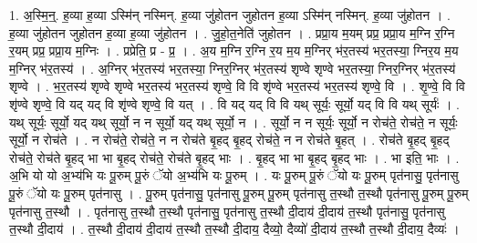 \documentclass[17pt]{extarticle}
\begin{document}
1. अ॒स्मि॒न्॒. ह॒व्या ह॒व्या ऽस्मि॑न् नस्मिन्. ह॒व्या जु॑होतन जुहोतन ह॒व्या ऽस्मि॑न् नस्मिन्. ह॒व्या जु॑होतन । . ह॒व्या जु॑होतन जुहोतन ह॒व्या ह॒व्या जु॑होतन । . जु॒हो॒त॒नेति॑ जुहोतन । . प्रप्रा॒य म॒यम् प्रप्र॒ प्रप्रा॒य म॒ग्नि र॒ग्नि र॒यम् प्रप्र॒ प्रप्रा॒य म॒ग्निः । . प्रप्रेति॒ प्र - प्र॒ । . अ॒य म॒ग्नि र॒ग्नि र॒य म॒य म॒ग्निर् भ॑र॒तस्य॑ भर॒तस्या॒ ग्निर॒य म॒य म॒ग्निर् भ॑र॒तस्य॑ । . अ॒ग्निर् भ॑र॒तस्य॑ भर॒तस्या॒ ग्निर॒ग्निर् भ॑र॒तस्य॑ शृण्वे शृण्वे भर॒तस्या॒ ग्निर॒ग्निर् भ॑र॒तस्य॑ शृण्वे । . भ॒र॒तस्य॑ शृण्वे शृण्वे भर॒तस्य॑ भर॒तस्य॑ शृण्वे॒ वि वि शृ॑ण्वे भर॒तस्य॑ भर॒तस्य॑ शृण्वे॒ वि । . शृ॒ण्वे॒ वि वि शृ॑ण्वे शृण्वे॒ वि यद् यद् वि शृ॑ण्वे शृण्वे॒ वि यत् । . वि यद् यद् वि वि यथ् सूर्यः॒ सूर्यो॒ यद् वि वि यथ् सूर्यः॑ । . यथ् सूर्यः॒ सूर्यो॒ यद् यथ् सूर्यो॒ न न सूर्यो॒ यद् यथ् सूर्यो॒ न । . सूर्यो॒ न न सूर्यः॒ सूर्यो॒ न रोच॑ते॒ रोच॑ते॒ न सूर्यः॒ सूर्यो॒ न रोच॑ते । . न रोच॑ते॒ रोच॑ते॒ न न रोच॑ते बृ॒हद् बृ॒हद् रोच॑ते॒ न न रोच॑ते बृ॒हत् । . रोच॑ते बृ॒हद् बृ॒हद् रोच॑ते॒ रोच॑ते बृ॒हद् भा भा बृ॒हद् रोच॑ते॒ रोच॑ते बृ॒हद् भाः । . बृ॒हद् भा भा बृ॒हद् बृ॒हद् भाः । . भा इति॒ भाः । . अ॒भि यो यो अ॒भ्य॑भि यः पू॒रुम् पू॒रुं ॅयो अ॒भ्य॑भि यः पू॒रुम् । . यः पू॒रुम् पू॒रुं ॅयो यः पू॒रुम् पृत॑नासु॒ पृत॑नासु पू॒रुं ॅयो यः पू॒रुम् पृत॑नासु । . पू॒रुम् पृत॑नासु॒ पृत॑नासु पू॒रुम् पू॒रुम् पृत॑नासु त॒स्थौ त॒स्थौ पृत॑नासु पू॒रुम् पू॒रुम् पृत॑नासु त॒स्थौ । . पृत॑नासु त॒स्थौ त॒स्थौ पृत॑नासु॒ पृत॑नासु त॒स्थौ दी॒दाय॑ दी॒दाय॑ त॒स्थौ पृत॑नासु॒ पृत॑नासु त॒स्थौ दी॒दाय॑ । . त॒स्थौ दी॒दाय॑ दी॒दाय॑ त॒स्थौ त॒स्थौ दी॒दाय॒ दैव्यो॒ दैव्यो॑ दी॒दाय॑ त॒स्थौ त॒स्थौ दी॒दाय॒ दैव्यः॑ । \newline
\end{document}

